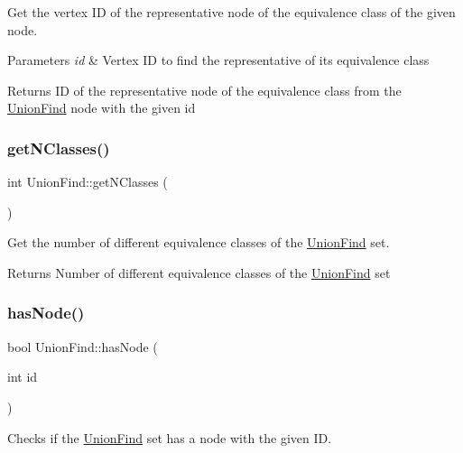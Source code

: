 Get the vertex ID of the representative node of the equivalence class of the given node. 


\begin{DoxyParams}{Parameters}
{\em id} & Vertex ID to find the representative of its equivalence class \\
\hline
\end{DoxyParams}
\begin{DoxyReturn}{Returns}
ID of the representative node of the equivalence class from the \hyperlink{classUnionFind}{Union\+Find} node with the given id 
\end{DoxyReturn}
\mbox{\label{classUnionFind_a47b6b7874590396185e6cf17bfec37c8}} 
\subsubsection{\texorpdfstring{get\+N\+Classes()}{getNClasses()}}
{\footnotesize\ttfamily int Union\+Find\+::get\+N\+Classes (\begin{DoxyParamCaption}{ }\end{DoxyParamCaption})}



Get the number of different equivalence classes of the \hyperlink{classUnionFind}{Union\+Find} set. 

\begin{DoxyReturn}{Returns}
Number of different equivalence classes of the \hyperlink{classUnionFind}{Union\+Find} set 
\end{DoxyReturn}
\mbox{\label{classUnionFind_a621d2ffe71e3b584b81c2da377da0f87}} 
\subsubsection{\texorpdfstring{has\+Node()}{hasNode()}}
{\footnotesize\ttfamily bool Union\+Find\+::has\+Node (\begin{DoxyParamCaption}\item[{int}]{id }\end{DoxyParamCaption})}



Checks if the \hyperlink{classUnionFind}{Union\+Find} set has a node with the given ID. 


